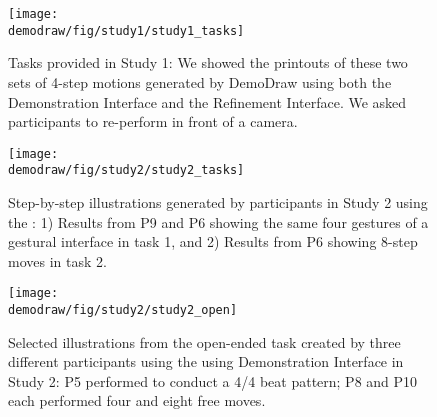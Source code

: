 \begin{appendices}

\renewcommand\thefigure{A.\arabic{figure}}
\setcounter{figure}{0}
\begin{figure}
   \begin{minipage}[b]{1.0\textwidth}
     \centering
    \texttt{[image: \\demodraw/fig/study1/study1\_tasks]}
    \caption{Tasks provided in Study 1: We showed the printouts of these two sets of 4-step motions generated by DemoDraw using both the Demonstration Interface and the Refinement Interface. We asked participants to re-perform in front of a camera.}
    \label{fig:study_review_tasks}
   \end{minipage}

   \vspace{6mm}
   \begin{minipage}[b]{1.0\textwidth}
     \centering
    \texttt{[image: \\demodraw/fig/study2/study2\_tasks]}
    \caption{Step-by-step illustrations generated by participants in Study 2 using the \phaseI{}: 1) Results from P9 and P6 showing the same four gestures of a gestural interface in task 1, and 2) Results from P6 showing 8-step moves in task 2.}
    \label{fig:study_authoring_tasks}
   \end{minipage}

   \vspace{6mm}
   \begin{minipage}[b]{1.0\textwidth}
     \centering
    \texttt{[image: \\demodraw/fig/study2/study2\_open]}
    \caption{Selected illustrations from the open-ended task created by three different participants using the using Demonstration Interface in Study 2: P5 performed to conduct a 4/4 beat pattern; P8 and P10 each performed four and eight free moves.}
    \label{fig:open_ended_examples}
   \end{minipage}
 \end{figure}

\end{appendices}
